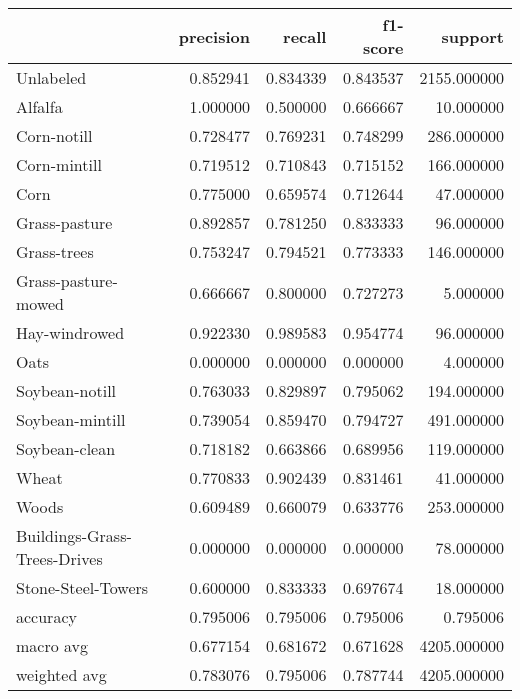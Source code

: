 \begin{tabular}{lrrrr}
\toprule
{} &  precision &    recall &  f1-score &      support \\
\midrule
Unlabeled                    &   0.852941 &  0.834339 &  0.843537 &  2155.000000 \\
Alfalfa                      &   1.000000 &  0.500000 &  0.666667 &    10.000000 \\
Corn-notill                  &   0.728477 &  0.769231 &  0.748299 &   286.000000 \\
Corn-mintill                 &   0.719512 &  0.710843 &  0.715152 &   166.000000 \\
Corn                         &   0.775000 &  0.659574 &  0.712644 &    47.000000 \\
Grass-pasture                &   0.892857 &  0.781250 &  0.833333 &    96.000000 \\
Grass-trees                  &   0.753247 &  0.794521 &  0.773333 &   146.000000 \\
Grass-pasture-mowed          &   0.666667 &  0.800000 &  0.727273 &     5.000000 \\
Hay-windrowed                &   0.922330 &  0.989583 &  0.954774 &    96.000000 \\
Oats                         &   0.000000 &  0.000000 &  0.000000 &     4.000000 \\
Soybean-notill               &   0.763033 &  0.829897 &  0.795062 &   194.000000 \\
Soybean-mintill              &   0.739054 &  0.859470 &  0.794727 &   491.000000 \\
Soybean-clean                &   0.718182 &  0.663866 &  0.689956 &   119.000000 \\
Wheat                        &   0.770833 &  0.902439 &  0.831461 &    41.000000 \\
Woods                        &   0.609489 &  0.660079 &  0.633776 &   253.000000 \\
Buildings-Grass-Trees-Drives &   0.000000 &  0.000000 &  0.000000 &    78.000000 \\
Stone-Steel-Towers           &   0.600000 &  0.833333 &  0.697674 &    18.000000 \\
accuracy                     &   0.795006 &  0.795006 &  0.795006 &     0.795006 \\
macro avg                    &   0.677154 &  0.681672 &  0.671628 &  4205.000000 \\
weighted avg                 &   0.783076 &  0.795006 &  0.787744 &  4205.000000 \\
\bottomrule
\end{tabular}
